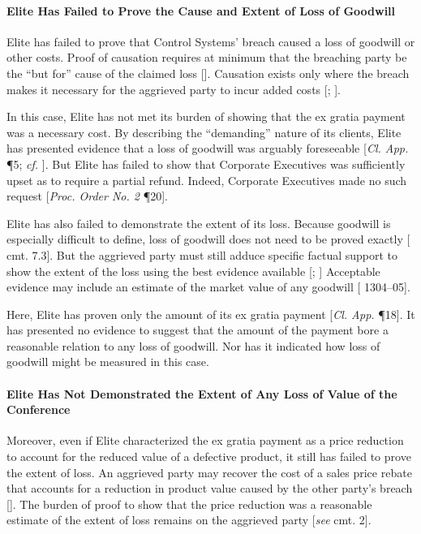 \paragraph{Elite Has Failed to Prove the Cause and Extent of Loss of Goodwill}

Elite has failed to prove that Control Systems' breach caused a loss of goodwill or other costs. Proof of causation requires at minimum that the breaching party be the ``but for'' cause of the claimed loss [\cite{Monarch S.S. Co. Ltd.}]. Causation exists only where the breach makes it necessary for the aggrieved party to incur added costs [\cite{China Yituo}; \cite{Stone Products Case}].

In this case, Elite has not met its burden of showing that the ex gratia payment was a necessary cost. By describing the ``demanding'' nature of its clients, Elite has presented evidence that a loss of goodwill was arguably foreseeable [\textit{Cl. App.} \P 5; \textit{cf.} \cite{Cheese Case}]. But Elite has failed to show that Corporate Executives was sufficiently upset as to require a partial refund. Indeed, Corporate Executives made no such request [\textit{Proc. Order No. 2} \P 20].

Elite has also failed to demonstrate the extent of its loss. Because goodwill is especially difficult to define, loss of goodwill does not need to be proved exactly [\cite{CISG-AC Op. No. 6} cmt. 7.3]. But the aggrieved party must still adduce specific factual support to show the extent of the loss using the best evidence available [\cite{Stallworth Timber Co.}; \cite{Master Records, Inc.}] Acceptable evidence may include an estimate of the market value of any goodwill [\cite{Cmty. Dev. Comm'n} 1304--05].

Here, Elite has proven only the amount of its ex gratia payment [\textit{Cl. App.} \P 18]. It has presented no evidence to suggest that the amount of the payment bore a reasonable relation to any loss of goodwill. Nor has it indicated how loss of goodwill might be measured in this case.

\paragraph{Elite Has Not Demonstrated the Extent of Any Loss of Value of the Conference}

Moreover, even if Elite characterized the ex gratia payment as a price reduction to account for the reduced value of a defective product, it still has failed to prove the extent of loss. An aggrieved party may recover the cost of a sales price rebate that accounts for a reduction in product value caused by the other party's breach [\cite{Zeller}]. The burden of proof to show that the price reduction was a reasonable estimate of the extent of loss remains on the aggrieved party [\textit{see} \cite{CISG-AC Op. No. 6} cmt. 2].

